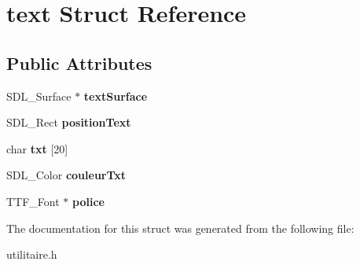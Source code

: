 \hypertarget{structtext}{}\section{text Struct Reference}
\label{structtext}
\subsection*{Public Attributes}
\begin{DoxyCompactItemize}
\item 
S\+D\+L\+\_\+\+Surface $\ast$ {\bfseries text\+Surface}\hypertarget{structtext_a1a9992f493ebd8946dc5a736d65e8213}{}\label{structtext_a1a9992f493ebd8946dc5a736d65e8213}

\item 
S\+D\+L\+\_\+\+Rect {\bfseries position\+Text}\hypertarget{structtext_a01cc24369eccbe9ccb68af9a748315d3}{}\label{structtext_a01cc24369eccbe9ccb68af9a748315d3}

\item 
char {\bfseries txt} \mbox{[}20\mbox{]}\hypertarget{structtext_afd7610607c0ade6ed450f86e275ddce5}{}\label{structtext_afd7610607c0ade6ed450f86e275ddce5}

\item 
S\+D\+L\+\_\+\+Color {\bfseries couleur\+Txt}\hypertarget{structtext_a0f3134d4dbc64c9b28fa625fb627f9c5}{}\label{structtext_a0f3134d4dbc64c9b28fa625fb627f9c5}

\item 
T\+T\+F\+\_\+\+Font $\ast$ {\bfseries police}\hypertarget{structtext_aec9ba02a1c093b1db8aa0f16ac092459}{}\label{structtext_aec9ba02a1c093b1db8aa0f16ac092459}

\end{DoxyCompactItemize}


The documentation for this struct was generated from the following file\+:\begin{DoxyCompactItemize}
\item 
utilitaire.\+h\end{DoxyCompactItemize}
